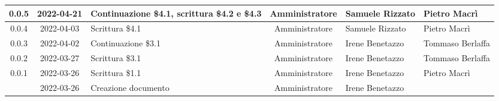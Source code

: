 \begin{center}
\begin{longtable}{ |c|c|p{8em}|c|m{5em}|m{6em}| }
	\hline
	0.0.5 & 2022-04-21 & Continuazione \$4.1, scrittura \$4.2 e \$4.3 & Amministratore & Samuele \newline Rizzato & Pietro \newline Macrì\\
	\hline
	0.0.4 & 2022-04-03 & Scrittura \$4.1 & Amministratore & Samuele \newline Rizzato & Pietro \newline Macrì\\
	\hline
	0.0.3 & 2022-04-02 & Continuazione \$3.1 & Amministratore & Irene \newline Benetazzo & Tommaso \newline Berlaffa \\
	\hline
	0.0.2 & 2022-03-27 & Scrittura \$3.1 & Amministratore & Irene \newline Benetazzo & Tommaso \newline Berlaffa \\
	\hline
	0.0.1 & 2022-03-26 & Scrittura \$1.1 & Amministratore & Irene \newline Benetazzo & Pietro \newline Macrì \\
	\hline
    & 2022-03-26 & Creazione documento & Amministratore & Irene \newline Benetazzo & \\
	\hline
	\end{longtable}
	\end{center}
	\newpage
